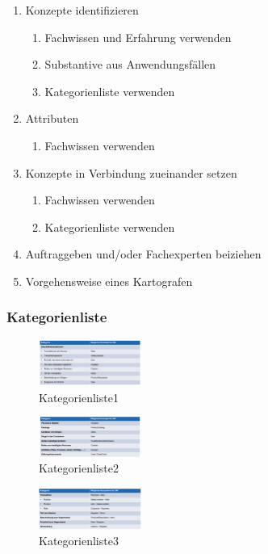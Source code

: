 \documentclass{article}
\begin{document}
\begin{enumerate}
	\item Konzepte identifizieren
	\begin{enumerate}
		\item Fachwissen und Erfahrung verwenden
		\item Substantive aus Anwendungsfällen
		\item Kategorienliste verwenden
	\end{enumerate}
	\item Attributen
		\begin{enumerate}
		\item Fachwissen verwenden
	\end{enumerate}
	\item Konzepte in Verbindung zueinander setzen
			\begin{enumerate}
		\item Fachwissen verwenden
		\item Kategorienliste verwenden
	\end{enumerate}
	\item Auftraggeben und/oder Fachexperten beiziehen
	\item Vorgehensweise eines Kartografen
	
\end{enumerate}

\subsubsection{Kategorienliste}

\begin{multicols}{3}
\begin{figure}[H]
	\centering
	\includegraphics[width=0.3\textwidth] {Resources/Images/Kategorienliste1.png}
	\caption{\label{fig:Kategorienliste1}Kategorienliste1}
	\end{figure}


\columnbreak
\begin{figure}[H]
	\centering
	\includegraphics[width=0.3\textwidth] {Resources/Images/Kategorienliste2.png}
	\caption{\label{fig:Kategorienliste2}Kategorienliste2}
	\end{figure}
\columnbreak
\begin{figure}[H]
	\centering
	\includegraphics[width=0.3\textwidth] {Resources/Images/Kategorienliste3.png}
	\caption{\label{fig:Kategorienliste3}Kategorienliste3}
	\end{figure}
\end{multicols}
\end{document}
